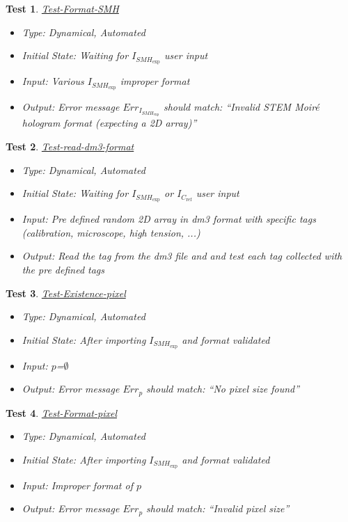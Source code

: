 \documentclass[12pt, titlepage]{article}
\newtheorem{Test}{Test}
\begin{document}
\begin{Test}\normalfont\underline{Test-Format-SMH}
\label{Test-Format-SMH}
\begin{itemize}
\item Type: Dynamical, Automated
\item Initial State: Waiting for $I_{\mathit{SMH}_{\text{exp}}}$ user input
\item Input: Various $I_{\mathit{SMH}_{\text{exp}}}$ improper format
\item Output: Error message $Err_{I_{\mathit{SMH}_{\text{exp}}}}$ should match: \enquote{Invalid STEM Moir{\'e} hologram format (expecting a 2D array)}
\end{itemize}
\end{Test}

\begin{Test}\normalfont\underline{Test-read-dm3-format}
\label{Test-read-dm3-format}
\begin{itemize}
\item Type: Dynamical, Automated
\item Initial State: Waiting for $I_{\mathit{SMH}_{\text{exp}}}$ or $I_{C_{\text{ref}}}$ user input
\item Input: Pre defined random 2D array in dm3 format with specific tags (calibration, microscope, high tension, ...)
\item Output: Read the tag from the dm3 file and and test each tag collected with the pre defined tags
\end{itemize}
\end{Test}

\begin{Test}\normalfont\underline{Test-Existence-pixel}
\label{Test-Existence-pixel}
\begin{itemize}
\item Type: Dynamical, Automated
\item Initial State: After importing $I_{\mathit{SMH}_{\text{exp}}}$ and format validated
\item Input: $p$=$\emptyset$
\item Output: Error message $Err_{p}$ should match: \enquote{No pixel size found}
\end{itemize}
\end{Test}

\begin{Test}\normalfont\underline{Test-Format-pixel}
\label{Test-Format-pixel}
\begin{itemize}
\item Type: Dynamical, Automated
\item Initial State: After importing $I_{\mathit{SMH}_{\text{exp}}}$ and format validated
\item Input: Improper format of $p$
\item Output: Error message $Err_{p}$ should match: \enquote{Invalid pixel size}
\end{itemize}
\end{Test}
\end{document}
